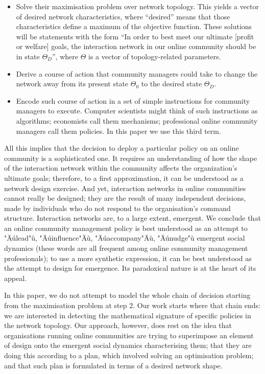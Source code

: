 \documentclass{nws}
\begin{document}
\begin{enumerate}
\begin{itemize}
	\item Solve their maximisation problem over network topology. This yields a vector of desired network characteristics, where ``desired'' means that those characteristics define a maximum of the objective function. These solutions will be statements with the form ``In order to best meet our ultimate [profit or welfare] goals, the interaction network in our online community should be in state $\Theta_D$'', where $\Theta$ is a vector of topology-related parameters.
	\item Derive a course of action that community managers could take to change the network away from its present state $\Theta_0$ to the desired state $\Theta_D$.
	\item Encode such course of action in a set of simple instructions for community managers to execute. Computer scientists might think of such instructions as algorithms; economists call them mechanisms; professional online community managers call them policies. In this paper we use this third term. 
    \end{itemize}
\end{enumerate}

All this implies that the decision to deploy a particular policy on an online community is a sophisticated one. It requires an understanding of how the shape of the interaction network within the community affects the organization's ultimate goals; therefore, to a first approximation, it can be understood as a network design exercise. And yet, interaction networks in online communities cannot really be designed; they are the result of many independent decisions, made by individuals who do not respond to the organisation's command structure. Interaction networks are, to a large extent, emergent. We conclude that an online community management policy is best understood as an attempt to "Äúlead"ù, "Äúinfluence"Äù, "Äúaccompany"Äù, "Äúnudge"ù emergent social dynamics (these words are all  frequent among online community management professionals); to use a more synthetic expression, it can be best understood as the attempt to design for emergence. Its paradoxical nature is at the heart of its appeal. 

In this paper, we do not attempt to model the whole chain of decision starting from the maximisation problem at step 2. Our work starts where that chain ends: we are interested in detecting the mathematical signature of specific policies in the network topology. Our approach, however, does rest on the idea that organisations running online communities are trying to superimpose an element of design onto the emergent social dynamics characterising them; that they are doing this according to a plan, which involved solving an optimisation problem; and that such plan is formulated in terms of a desired network shape. 
\end{document}
